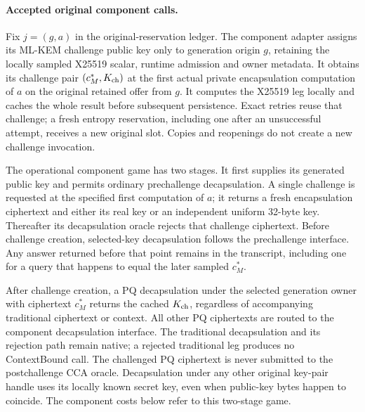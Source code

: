 \paragraph{Accepted original component calls.}
Fix $j=(g,a)$ in the original-reservation ledger. The component
adapter assigns its ML-KEM challenge public key only to generation origin
$g$, retaining the locally sampled X25519 scalar, runtime admission and
owner metadata. It obtains its challenge pair $(c_M^*,K_{\rm ch})$ at the
first actual private encapsulation computation of $a$ on the original
retained offer from $g$. It computes the X25519 leg locally and caches the
whole result before subsequent persistence. Exact retries reuse that
challenge; a fresh entropy reservation, including one after an unsuccessful
attempt, receives a new original slot. Copies and reopenings do
not create a new challenge invocation.

The operational component game has two stages. It first supplies its
generated public key and permits ordinary prechallenge decapsulation.
A single challenge is requested at the specified first computation of
$a$; it returns a fresh encapsulation ciphertext and either its real key
or an independent uniform 32-byte key. Thereafter its decapsulation
oracle rejects that challenge ciphertext. Before challenge creation,
selected-key decapsulation follows the prechallenge interface. Any answer
returned before that point remains in the transcript, including one for a
query that happens to equal the later sampled $c_M^*$.

After challenge creation, a PQ decapsulation under the selected generation
owner with ciphertext $c_M^*$ returns the cached $K_{\rm ch}$, regardless
of accompanying traditional ciphertext or context. All other PQ
ciphertexts are routed to the component decapsulation interface. The
traditional decapsulation and its rejection path remain native; a rejected
traditional leg produces no ContextBound call. The challenged PQ
ciphertext is never submitted to the postchallenge CCA oracle. Decapsulation
under any other original key-pair handle uses its locally known secret key,
even when public-key bytes happen to coincide. The component costs below
refer to this two-stage game.

